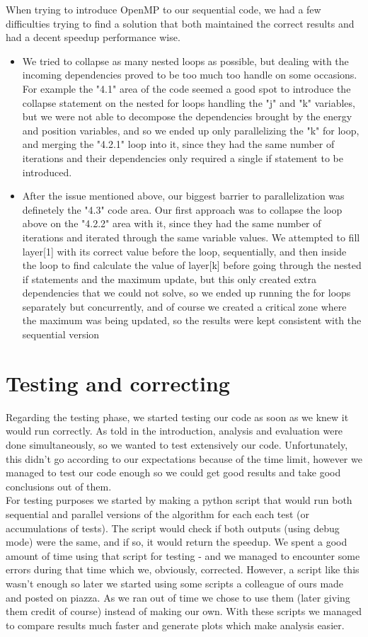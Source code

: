 \documentclass[10pt,journal,compsoc]{IEEEtran}
\begin{document}
When trying to introduce OpenMP to our sequential code, we had a few difficulties trying to find a solution that both maintained the correct results and had a decent speedup performance wise.
\begin{itemize}
    \item We tried to collapse as many nested loops as possible, but dealing with the incoming dependencies proved to be too much too handle on some occasions. For example the "4.1" area of the code seemed a good spot to introduce the collapse statement on the nested for loops handling the "j" and "k" variables, but we were not able to decompose the dependencies brought by the energy and position variables, and so we ended up only parallelizing the "k" for loop, and merging the "4.2.1" loop into it, since they had the same number of iterations and their dependencies only required a single if statement to be introduced.
    \item After the issue mentioned above, our biggest barrier to parallelization was definetely the "4.3" code area. Our first approach was to collapse the loop above on the "4.2.2" area with it, since they had the same number of iterations and iterated through the same variable values. We attempted to fill layer[1] with its correct value before the loop, sequentially, and then inside the loop to find calculate the value of layer[k] before going through the nested if statements and the maximum update, but this only created extra dependencies that we could not solve, so we ended up running the for loops separately but concurrently, and of course we created a critical zone where the maximum was being updated, so the results were kept consistent with the sequential version
\end{itemize}

\section{Testing and correcting}
Regarding the testing phase, we started testing our code as soon as we knew it would run correctly. As told in the introduction, analysis and evaluation were done simultaneously, so we wanted to test extensively our code. Unfortunately, this didn't go according to our expectations because of the time limit, however we managed to test our code enough so we could get good results and take good conclusions out of them.
\\
For testing purposes we started by making a python script that would run both sequential and parallel versions of the algorithm for each each test (or accumulations of tests). The script would check if both outputs (using debug mode) were the same, and if so, it would return the speedup. We spent a good amount of time using that script for testing - and we managed to encounter some errors during that time which we, obviously, corrected. However, a script like this wasn't enough so later we started using some scripts a colleague of ours made and posted on piazza. As we ran out of time we chose to use them (later giving them credit of course) instead of making our own. With these scripts we managed to compare results much faster and generate plots which make analysis easier.
\end{document}
